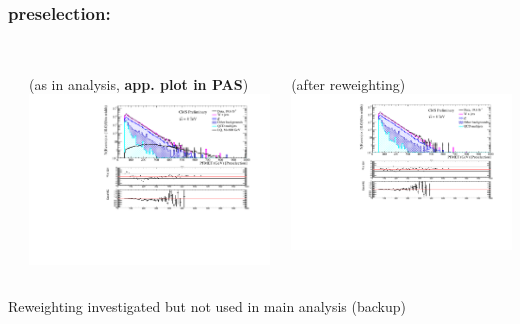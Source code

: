 \documentclass[bigger]{beamer}
\providecommand{\alert}[1]{\textbf{#1}}
\begin{document}
\begin{frame}
\frametitle{\enujj preselection: \met}
\label{sec-3-1-2}
\begin{columns} %
\label{sec-3-1-2-1}
\begin{column}{0.6\textwidth}
\label{sec-3-1-2-1-1}

\centering
\met \\ (as in analysis, \alert{app. plot in PAS})
\includegraphics[width=\textwidth]{fig/enu/preselection/MET_PAS_enujj.pdf}
\end{column}
\begin{column}{0.6\textwidth}
\label{sec-3-1-2-1-2}

\centering
\met \\ (after reweighting)
\includegraphics[width=\textwidth]{fig/enu/reweight/MET_PAS_enujjMETandMTReweighted.pdf}
\end{column}
\end{columns}
\label{sec-3-1-2-2}

\small
\centering
Reweighting investigated but not used in main analysis (backup)
\normalsize
\end{frame}
\end{document}
